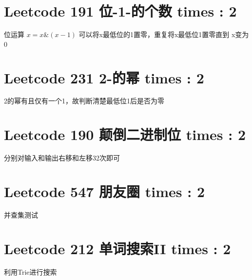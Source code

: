 \documentclass[UTF8]{ctexart}
\begin{document}
\section{Leetcode 191 位-1-的个数 times : 2}
位运算 $x = x\&(x - 1)$ 可以将x最低位的1置零，重复将x最低位1置零直到
x变为0

\section{Leetcode 231 2-的幂 times : 2}
2的幂有且仅有一个1，故判断清楚最低位1后是否为零

\section{Leetcode 190 颠倒二进制位 times : 2}
分别对输入和输出右移和左移32次即可

\section{Leetcode 547 朋友圈 times : 2}
并查集测试

\section{Leetcode 212 单词搜索II times : 2}
利用Trie进行搜索
\end{document}
